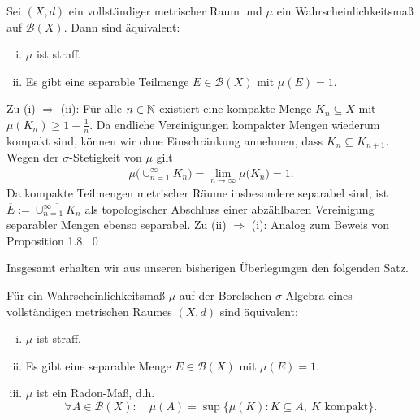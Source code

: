 \begin{proposition}
    Sei $(X,d)$ ein vollständiger metrischer Raum und $\mu$ ein Wahrscheinlichkeitsmaß auf $\mathcal{B}(X)$. Dann sind äquivalent:
    \begin{enumerate}[(i)]
        \item $\mu$ ist straff.
        \item Es gibt eine separable Teilmenge $E \in \mathcal{B}(X)$ mit $\mu(E) = 1$. 
    \end{enumerate}
\end{proposition}
\begin{proof*}
    Zu (i) $\Rightarrow$ (ii): Für alle $n \in \mathbb{N}$ existiert eine kompakte Menge $K_n \subseteq X$ mit $\mu(K_n) \geq 1 - \frac{1}{n}$.
    Da endliche Vereinigungen kompakter Mengen wiederum kompakt sind, können wir ohne Einschränkung annehmen, dass $K_n \subseteq K_{n+1}$. 
    Wegen der $\sigma$-Stetigkeit von $\mu$ gilt  
    \begin{align*}
        \mu\big(\cup_{n=1}^{\infty}K_n\big) = \lim_{n \to \infty}\mu\big(K_ n\big) = 1. 
    \end{align*}
    Da kompakte Teilmengen metrischer Räume insbesondere separabel sind, ist $\overline{E} := \overline{\cup_{n=1}^{\infty}K_n}$ als topologischer Abschluss einer abzählbaren Vereinigung separabler Mengen ebenso separabel. 
    \newline 
    Zu (ii) $\Rightarrow$ (i): 
    Analog zum Beweis von Proposition 1.8. \qed
\end{proof*}

Insgesamt erhalten wir aus unseren bisherigen Überlegungen den folgenden Satz. 

\begin{theorem}
    Für ein Wahrscheinlichkeitsmaß $\mu$ auf der Borelschen $\sigma$-Algebra eines vollständigen metrischen Raumes $(X,d)$ sind äquivalent:
    \begin{enumerate}[(i)]
        \item $\mu$ ist straff.
        \item Es gibt eine separable Menge $E \in \mathcal{B}(X)$ mit $\mu(E) = 1$.
        \item $\mu$ ist ein Radon-Maß, d.h.
        $$
        \forall A \in \mathcal{B}(X): \quad \mu(A) = \sup\{\mu(K): K \subseteq A, \ K \text{ kompakt}\}.
        $$   
    \end{enumerate}
\end{theorem}

